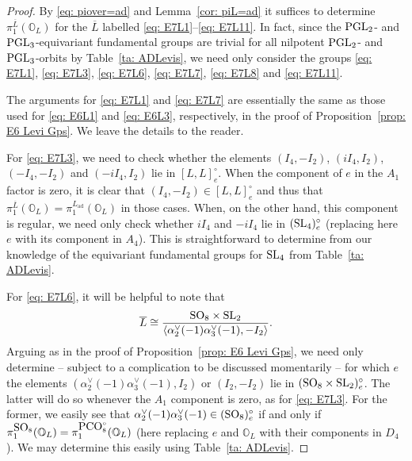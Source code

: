 \documentclass[11pt]{amsart}
\renewcommand{\O}{{\mathbb O}}
\newcommand{\ad}{{\operatorname{ad}}}
\newcommand{\SL}{{{\mbox{\rm SL}}}}
\newcommand{\PCO}{{{\mbox{\rm PCO}}}}
\newcommand{\PGL}{{{\mbox{\rm PGL}}}}
\newcommand{\SO}{{{\mbox{\rm SO}}}}
\numberwithin{equation}{section}
\begin{document}
	\begin{proof}
		By \eqref{eq: piover=ad} and Lemma~\ref{cor: piL=ad} it suffices to determine $\pi_1^{\overline{L}}(\O_L)$ for the $\overline{L}$ labelled \eqref{eq: E7L1}--\eqref{eq: E7L11}. In fact, since the $\PGL_2$- and $\PGL_3$-equivariant fundamental groups are trivial for all nilpotent $\PGL_2$- and $\PGL_3$-orbits by Table~\ref{ta: ADLevis}, we need only consider the groups \eqref{eq: E7L1}, \eqref{eq: E7L3}, \eqref{eq: E7L6}, \eqref{eq: E7L7}, \eqref{eq: E7L8} and \eqref{eq: E7L11}.
		
		The arguments for \eqref{eq: E7L1} and \eqref{eq: E7L7} are essentially the same as those used for \eqref{eq: E6L1} and \eqref{eq: E6L3}, respectively, in the proof of Proposition~\ref{prop: E6 Levi Gps}. We leave the details to the reader.
		
		For \eqref{eq: E7L3}, we need to check whether the elements $(I_4,-I_2)$, $(iI_4,I_2)$, $(-I_4,-I_2)$ and $(-iI_4,I_2)$ lie in $[L,L]_e^\circ$. When the component of $e$ in the $A_1$ factor is zero, it is clear that $(I_4,-I_2)\in [L,L]_e^\circ$ and thus that $\pi_1^{\overline{L}}(\O_L)=\pi_1^{L_\ad}(\O_L)$ in those cases. When, on the other hand, this component is regular, we need only check whether $iI_4$ and $-iI_4$ lie in $(\SL_4)_e^\circ$ (replacing here $e$ with its component in $A_4$). This is straightforward to determine from our knowledge of the equivariant fundamental groups for $\SL_4$ from Table~\ref{ta: ADLevis}.
		
		For \eqref{eq: E7L6}, it will be helpful to note that $$\overline{L}\cong\frac{\SO_8\times \SL_2}{\langle \alpha_2^\vee(-1)\alpha_3^\vee(-1),-I_2\rangle}.$$ Arguing as in the proof of Proposition~\ref{prop: E6 Levi Gps}, we need only determine  -- subject to a complication to be discussed momentarily -- for which $e$ the elements $(\alpha_2^\vee(-1)\alpha_3^\vee(-1),I_2)$ or $(I_2,-I_2)$ lie in $(\SO_8\times \SL_2)_e^\circ$. The latter will do so whenever the $A_1$ component is zero, as for \eqref{eq: E7L3}. For the former, we easily see that $\alpha_2^\vee(-1)\alpha_3^\vee(-1)\in (\SO_8)_e^\circ$ if and only if $\pi_1^{\tiny \SO_8}(\O_L)=\pi_1^{\tiny \PCO_8^\circ}(\O_L)$ (here replacing $e$ and $\O_L$ with their components in $D_4$). We may determine this easily using Table~\ref{ta: ADLevis}. 
		

\end{proof}
\end{document}
